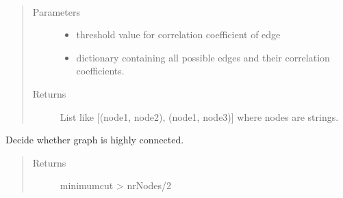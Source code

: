 \documentclass[letterpaper,10pt,english]{sphinxmanual}
\begin{document}
\begin{fulllineitems}
\label{\detokenize{clustering:clustering.createEdges}}~\begin{quote}\begin{description}
\item[{Parameters}] \leavevmode\begin{itemize}
\item {} 
\sphinxAtStartPar
{} \textendash{} threshold value for correlation coefficient of edge

\item {} 
\sphinxAtStartPar
{} \textendash{} dictionary containing all possible edges and their correlation coefficients.

\end{itemize}

\item[{Returns}] \leavevmode
\sphinxAtStartPar
List like {[}(node1, node2), (node1, node3){]} where nodes are strings.

\end{description}\end{quote}

\end{fulllineitems}


\begin{fulllineitems}
\label{\detokenize{clustering:clustering.highlyConnected}}
\sphinxAtStartPar
Decide whether graph is highly connected.
\begin{quote}\begin{description}
\item[{Returns}] \leavevmode
\sphinxAtStartPar
minimumcut \textgreater{} nrNodes/2

\end{description}\end{quote}

\end{fulllineitems}
\end{document}
